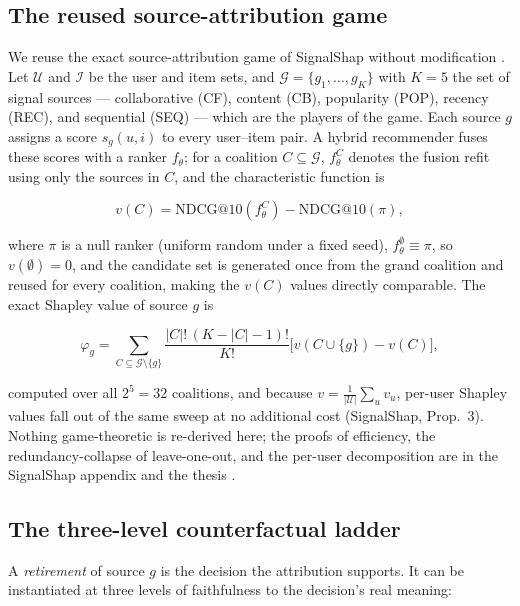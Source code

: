 \documentclass[pdflatex,sn-mathphys-num]{sn-jnl}
\makeatletter
\theoremstyle{thmstyleone}%
\theoremstyle{thmstyletwo}%
\theoremstyle{thmstylethree}%
\newcommand{\Gset}{\mathcal{G}}
\newcommand{\Uset}{\mathcal{U}}
\newcommand{\Iset}{\mathcal{I}}
\newcommand{\NDCG}{\mathrm{NDCG@10}}
\makeatother
\begin{document}
\subsection{The reused source-attribution game}\label{subsec3_1}

We reuse the exact source-attribution game of SignalShap without modification \cite{louhichi2026signalshap}. Let $\Uset$ and $\Iset$ be the user and item sets, and $\Gset=\{g_1,\dots,g_K\}$ with $K=5$ the set of signal sources --- collaborative (CF), content (CB), popularity (POP), recency (REC), and sequential (SEQ) --- which are the players of the game. Each source $g$ assigns a score $s_g(u,i)$ to every user--item pair. A hybrid recommender fuses these scores with a ranker $f_\theta$; for a coalition $C\subseteq\Gset$, $f_\theta^C$ denotes the fusion refit using only the sources in $C$, and the characteristic function is

\begin{equation}
v(C) = \NDCG\!\left(f_\theta^{C}\right) - \NDCG(\pi),
\label{eq1}
\end{equation}

where $\pi$ is a null ranker (uniform random under a fixed seed), $f_\theta^{\emptyset}\equiv\pi$, so $v(\emptyset)=0$, and the candidate set is generated once from the grand coalition and reused for every coalition, making the $v(C)$ values directly comparable. The exact Shapley value of source $g$ is

\begin{equation}
\varphi_g = \sum_{C\subseteq\Gset\setminus\{g\}} \frac{|C|!\,(K-|C|-1)!}{K!}\Big[v(C\cup\{g\}) - v(C)\Big],
\label{eq2}
\end{equation}

computed over all $2^5=32$ coalitions, and because $v=\frac{1}{|\Uset|}\sum_u v_u$, per-user Shapley values fall out of the same sweep at no additional cost (SignalShap, Prop.~3). Nothing game-theoretic is re-derived here; the proofs of efficiency, the redundancy-collapse of leave-one-out, and the per-user decomposition are in the SignalShap appendix \cite{louhichi2026signalshap} and the thesis \cite{louhichi2026thesis}.

\subsection{The three-level counterfactual ladder}\label{subsec3_2}

A \emph{retirement} of source $g$ is the decision the attribution supports. It can be instantiated at three levels of faithfulness to the decision's real meaning:
\end{document}
